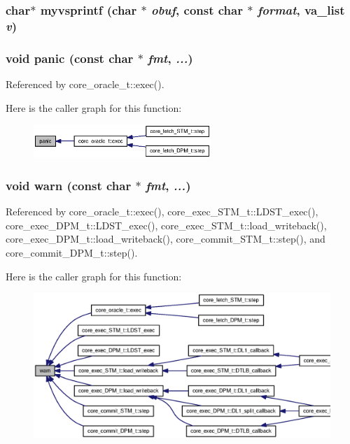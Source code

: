 \subsubsection[{myvsprintf}]{\setlength{\rightskip}{0pt plus 5cm}char$\ast$ myvsprintf (char $\ast$ {\em obuf}, \/  const char $\ast$ {\em format}, \/  va\_\-list {\em v})}\label{misc_8h_e90a30a33cca2218c0f0435e7f43f629}


\subsubsection[{panic}]{\setlength{\rightskip}{0pt plus 5cm}void panic (const char $\ast$ {\em fmt}, \/   {\em ...})}\label{misc_8h_d1f1a1dc0581a11b597453f148106393}




Referenced by core\_\-oracle\_\-t::exec().

Here is the caller graph for this function:\nopagebreak
\begin{figure}[H]
\begin{center}
\leavevmode
\includegraphics[width=190pt]{misc_8h_d1f1a1dc0581a11b597453f148106393_icgraph}
\end{center}
\end{figure}
\subsubsection[{warn}]{\setlength{\rightskip}{0pt plus 5cm}void warn (const char $\ast$ {\em fmt}, \/   {\em ...})}\label{misc_8h_f80d19f1297a11626fab61a248959c71}




Referenced by core\_\-oracle\_\-t::exec(), core\_\-exec\_\-STM\_\-t::LDST\_\-exec(), core\_\-exec\_\-DPM\_\-t::LDST\_\-exec(), core\_\-exec\_\-STM\_\-t::load\_\-writeback(), core\_\-exec\_\-DPM\_\-t::load\_\-writeback(), core\_\-commit\_\-STM\_\-t::step(), and core\_\-commit\_\-DPM\_\-t::step().

Here is the caller graph for this function:\nopagebreak
\begin{figure}[H]
\begin{center}
\leavevmode
\includegraphics[width=353pt]{misc_8h_f80d19f1297a11626fab61a248959c71_icgraph}
\end{center}
\end{figure}

